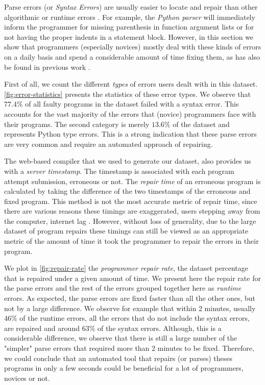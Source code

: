 Parse errors (or \emph{Syntax Errors}) are usually easier to locate and repair
than other algorithmic or runtime errors \citep{Denny_2012}. For example, the
\emph{Python parser} will immediately inform the programmer for missing
parenthesis in function argument lists or for not having the proper indents in a
statement block. However, in this section we show that programmers (especially
novices) mostly deal with these kinds of errors on a daily basis and spend a
considerable amount of time fixing them, as has also be found in previous work
\citep{Ahadi_2018, Kummerfeld2003}.

First of all, we count the different \emph{types} of errors users dealt with in
this dataset. \autoref{fig:error-statistics} presents the statistics of these
error types. We observe that $77.4 \% $ of all faulty programs in the dataset
failed with a syntax error. This accounts for the vast majority of the errors
that (novice) programmers face with their programs. The second category is
merely $13.6\%$ of the dataset and represents Python type errors. This is a
strong indication that these parse errors are very common and require an
automated approach of repairing.

The web-based compiler that we used to generate our dataset, also provides us
with a \emph{server timestamp}. The timestamp is associated with each program
attempt submission, erroneous or not. The \emph{repair time} of an erroneous
program is calculated by taking the difference of the two timestamps of the
erroneous and fixed program. This method is not the most accurate metric of
repair time, since there are various reasons these timings are exaggerated, \eg
users stepping away from the computer, internet lag \etc. However, without loss
of generality, due to the large dataset of program repairs these timings can
still be viewed as an appropriate metric of the amount of time it took the
programmer to repair the errors in their program.

We plot in \autoref{fig:repair-rate} the \emph{programmer repair rate}, \ie the
dataset percentage that is repaired under a given amount of time. We present
here the repair rate for the parse errors and the rest of the errors grouped
together here as \emph{runtime} errors. As expected, the parse errors are fixed
faster than all the other ones, but not by a large difference. We observe for
example that within 2 minutes, usually $46\%$ of the runtime errors, \ie all the
errors that do not include the syntax errors, are repaired and around $63\%$ of
the syntax errors. Although, this is a considerable difference, we observe that
there is still a large number of the "simpler" parse errors that required more
than 2 minutes to be fixed. Therefore, we could conclude that an automated tool
that repairs (or parses) theses programs in only a few seconds could be
beneficial for a lot of programmers, novices or not.

